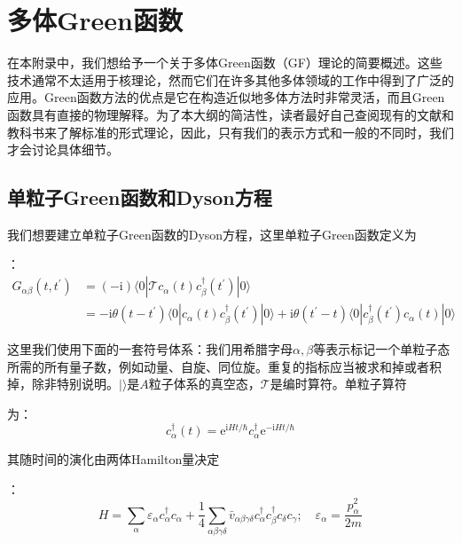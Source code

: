 
\chapter{多体Green函数}

在本附录中，我们想给予一个关于多体Green函数（GF）理论的简要概述。这些技术通常不太适用于核理论，然而它们在许多其他多体领域的工作中得到了广泛的应用。Green函数方法的优点是它在构造近似地多体方法时非常灵活，而且Green函数具有直接的物理解释。为了本大纲的简洁性，读者最好自己查阅现有的文献和教科书来了解标准的形式理论\cite{Mi67,AGD65,No64a,Ma67b,FW71}，因此，只有我们的表示方式和一般的不同时，我们才会讨论具体细节。

\section{单粒子Green函数和Dyson方程}

我们想要建立单粒子Green函数的Dyson方程，这里单粒子Green函数定义为

：
\begin{align*}
G_{\alpha\beta}(t,t^{\prime}) & =(-\mathrm{i})\langle0|\mathcal{T}c_{\alpha}(t)c^{\dagger}_{\beta}(t^{\prime})|0\rangle\\
 & =-\mathrm{i}\theta(t-t^{\prime})\langle0|c_{\alpha}(t)c^{\dagger}_{\beta}(t^{\prime})|0\rangle+\mathrm{i}\theta(t^{\prime}-t)\langle0|c^{\dagger}_{\beta}(t^{\prime})c_{\alpha}(t)|0\rangle
\end{align*}

这里我们使用下面的一套符号体系：我们用希腊字母$\alpha,\beta$等表示标记一个单粒子态所需的所有量子数，例如动量、自旋、同位旋。重复的指标应当被求和掉或者积掉，除非特别说明。$|\rangle$是$A$粒子体系的真空态，$\mathcal{T}$是编时算符。单粒子算符

为：
\[
c^{\dagger}_{\alpha}(t)=\mathrm{e}^{\mathrm{i}Ht/\hbar}c^{\dagger}_{\alpha}\mathrm{e}^{-\mathrm{i}Ht/\hbar}
\]

其随时间的演化由两体Hamilton量决定

：
\[
H=\sum_{\alpha}\varepsilon_{\alpha}c^{\dagger}_{\alpha}c_{\alpha}+\frac{1}{4}\sum_{\alpha\beta\gamma\delta}\bar{v}_{\alpha\beta\gamma\delta}c^{\dagger}_{\alpha}c^{\dagger}_{\beta}c_{\delta}c_{\gamma};\quad\varepsilon_{\alpha}=\frac{p^{2}_{\alpha}}{2m}
\]

